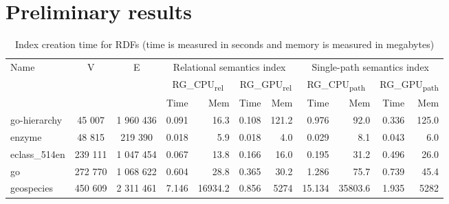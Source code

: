 \documentclass[sigconf, nonacm]{acmart}
\begin{document}
\section{Preliminary results}
{\setlength{\tabcolsep}{0.4em}
	\begin{table}[ht]
		\caption{Index creation time for RDFs (time is measured in seconds and memory is measured in megabytes)}
		\label{tbl:tableRDFQ1}
		\begin{tabular}{| l | c | c | r  r | r  r | r  r | r  r |}
			\hline
			
			\multirow{3}{*}{Name}  & \multirow{3}{*}{V} & \multirow{3}{*}{E} & \multicolumn{4}{|c|}{Relational semantics index}	&	\multicolumn{4}{|c|}{Single-path semantics index} \\
			\cline{4-11}
			& & &	\multicolumn{2}{|c|}{RG\_CPU\textsubscript{rel}}	&	\multicolumn{2}{|c|}{RG\_GPU\textsubscript{rel}} &	\multicolumn{2}{|c|}{RG\_CPU\textsubscript{path}}	&	\multicolumn{2}{|c|}{RG\_GPU\textsubscript{path}}	 \\
			\cline{4-11}
			&  & &  Time     & Mem & Time     & Mem  &  Time     & Mem & Time     & Mem \\
			\hline
			\hline
			go-hierarchy                & 45 007  & 1 960 436 & 0.091 & 16.3 & 0.108 & 121.2    & 0.976 & 92.0   & 0.336 & 125.0  \\
			enzyme                      & 48 815  & 219 390  & 0.018 & 5.9 & 0.018 & 4.0        & 0.029 & 8.1  & 0.043 & 6.0    \\	
			eclass\_514en                 & 239 111  & 1 047 454 & 0.067 & 13.8  & 0.166 & 16.0     & 0.195 & 31.2 & 0.496 & 26.0   \\
			go                          & 272 770  & 1 068 622 & 0.604  & 28.8  & 0.365 & 30.2     & 1.286 & 75.7 & 0.739 & 45.4 \\
			geospecies                        & 450 609  & 2 311 461  & 7.146 & 16934.2   & 0.856 & 5274      & 15.134 & 35803.6  & 1.935  & 5282  \\
			\hline
		\end{tabular}
	\end{table}
}
\end{document}
